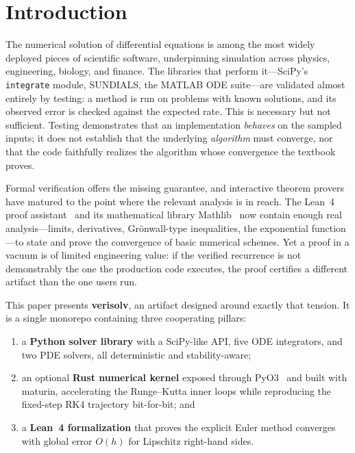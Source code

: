 \documentclass[sigplan,nonacm,screen,review]{acmart}
\begin{document}
\section{Introduction}
\label{sec:intro}

The numerical solution of differential equations is among the most widely
deployed pieces of scientific software, underpinning simulation across physics,
engineering, biology, and finance. The libraries that perform it---SciPy's
\texttt{integrate} module, SUNDIALS, the MATLAB ODE suite---are validated almost
entirely by testing: a method is run on problems with known solutions, and its
observed error is checked against the expected rate. This is necessary but not
sufficient. Testing demonstrates that an implementation \emph{behaves} on the
sampled inputs; it does not establish that the underlying \emph{algorithm} must
converge, nor that the code faithfully realizes the algorithm whose convergence
the textbook proves.

Formal verification offers the missing guarantee, and interactive theorem
provers have matured to the point where the relevant analysis is in reach. The
Lean~4 proof assistant~\cite{demoura2021lean4} and its mathematical library
Mathlib~\cite{mathlib2020} now contain enough real analysis---limits,
derivatives, Grönwall-type inequalities, the exponential function---to state and
prove the convergence of basic numerical schemes. Yet a proof in a vacuum is of
limited engineering value: if the verified recurrence is not demonstrably the
one the production code executes, the proof certifies a different artifact than
the one users run.

This paper presents \textbf{verisolv}, an artifact designed around exactly that
tension. It is a single monorepo containing three cooperating pillars:

\begin{enumerate}
\item a \textbf{Python solver library} with a SciPy-like API, five ODE
integrators, and two PDE solvers, all deterministic and stability-aware;
\item an optional \textbf{Rust numerical kernel} exposed through
PyO3~\cite{pyo3} and built with maturin, accelerating the Runge--Kutta inner
loops while reproducing the fixed-step RK4 trajectory bit-for-bit; and
\item a \textbf{Lean~4 formalization} that proves the explicit Euler method
converges with global error $O(h)$ for Lipschitz right-hand sides.
\end{enumerate}
\end{document}
